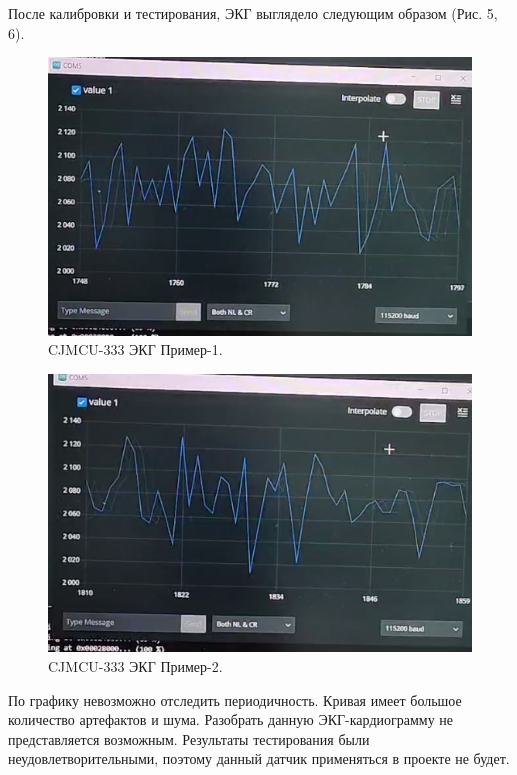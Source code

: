 \documentclass[12pt, russian]{extarticle}
\begin{document}
\begin{spacing}{1.5}
После калибровки и тестирования, ЭКГ выглядело следующим образом (Рис. 5, 6).

\begin{figure}[htbp]
\centering
\includegraphics[scale=0.6]{resources/cjmcu333/1.png}
\caption{CJMCU-333 ЭКГ Пример-1.}
\label{fig:my_label}
\end{figure}

\begin{figure}[htbp]
\centering
\includegraphics[scale=0.6]{resources/cjmcu333/2.png}
\caption{CJMCU-333 ЭКГ Пример-2.}
\label{fig:my_label}
\end{figure}

\newpage


По графику невозможно отследить периодичность. Кривая имеет большое количество артефактов и шума. Разобрать данную ЭКГ-кардиограмму не представляется возможным. Результаты тестирования были неудовлетворительными, поэтому данный датчик применяться в проекте не будет.


\end{spacing}
\end{document}

